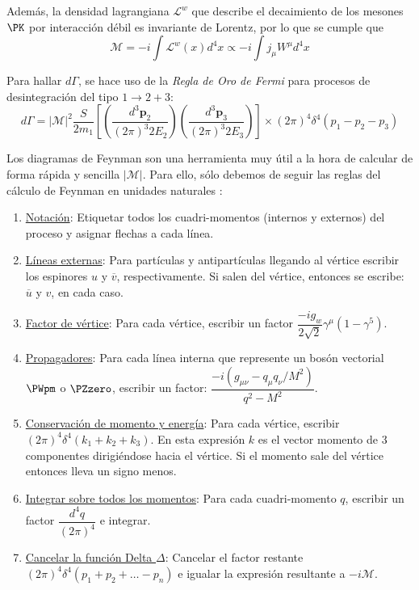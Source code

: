 Además, la densidad lagrangiana ${\mathcal{L}}^w$ que describe el decaimiento de los mesones $\PK$ por interacción débil es invariante de Lorentz, por lo que se cumple que \cite{Halzen}
\begin{equation}
\mathcal{M}=-i \int {\mathcal{L}}^w \left(x\right) d^{4}x \propto -i\int j_{\mu }W^{\mu }d^{4}x
\end{equation}

Para hallar $d\Gamma$, se hace uso de la \textit{Regla de Oro de Fermi} para procesos de desintegración del tipo $1 \rightarrow 2+3$:
\begin{equation}
d\Gamma =\left| \mathcal{M}\right| ^{2}\dfrac{S}{2m_{1}}\left[ \left( \dfrac{d^{3}\boldsymbol{p}_{2}}{\left( 2\pi \right) ^{3}2E_{2}}\right) \left( \dfrac{d^{3}\boldsymbol{p}_{3}}{\left( 2\pi \right) ^{3}2E_{3}}\right) \right] \times \left( 2\pi \right) ^{4}\delta ^{4}\left( p_{1}-p_{2}-p_{3}\right) 
\end{equation}

Los diagramas de Feynman son una herramienta muy útil a la hora de calcular de forma rápida y sencilla $\left| \mathcal{M}\right|$. Para ello, sólo debemos de seguir las reglas del cálculo de Feynman en unidades naturales \cite{Griffiths2008}:

\begin{enumerate}
\item \underline{Notación}: Etiquetar todos los cuadri-momentos (internos y externos) del proceso y asignar flechas a cada línea.
\item \underline{Líneas externas}: Para partículas y antipartículas llegando al vértice escribir los espinores $u$ y $\overline{v}$, respectivamente. Si salen del vértice, entonces se escribe: $\overline{u}$ y $v$, en cada caso.
\item \underline{Factor de vértice}: Para cada vértice, escribir un factor $\dfrac{-ig_{w}}{2\sqrt{2}}\gamma ^{\mu }\left( 1-\gamma ^{5}\right)$. 
\item \underline{Propagadores}: Para cada línea interna que represente un bosón vectorial $\PWpm$ o $\PZzero$, escribir un factor: 
$\dfrac{-i\left( g_{\mu\nu }-q_{\mu }q_{\nu }/M^{2}\right) }{q^{2}-M^{2}}$.
\item \underline{Conservación de momento y energía}: Para cada vértice, escribir $\left( 2\pi \right) ^{4}\delta ^{4}\left( k_{1}+k_{2}+k_{3}\right)$. En esta expresión $k$ es el vector momento de 3 componentes dirigiéndose hacia el vértice. Si el momento sale del vértice entonces lleva un signo menos.
\item \underline{Integrar sobre todos los momentos}: Para cada cuadri-momento $q$, escribir un factor $\dfrac{d^{4}q}{\left( 2\pi \right) ^{4}}$ e integrar.
\item \underline{Cancelar la función Delta $\Delta$}: Cancelar el factor restante $\left( 2\pi \right) ^{4}\delta ^{4}\left( p_{1}+p_{2}+\ldots -p_{n}\right)$ e igualar la expresión resultante a $-i\mathcal{M}$.
\end{enumerate}


